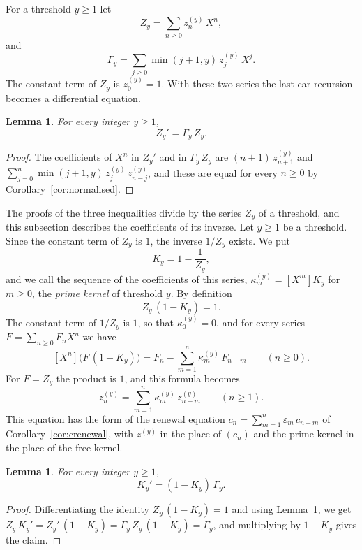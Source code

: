 \documentclass{amsart}
\makeatletter
\newtheorem{lemma}[theorem]{Lemma}
\theoremstyle{definition}
\theoremstyle{remark}
\numberwithin{equation}{section}
\def\subsection{\@startsection{subsection}{2}\z@{.5\linespacing\@plus.7\linespacing}{-.5em}{\normalfont\bfseries\boldmath}}
\makeatother
\begin{document}
For a threshold $y\ge 1$ let
\[
Z_y=\sum_{n\ge 0}z^{(y)}_n\,X^n ,
\]
and
\[
\Gamma_y=\sum_{j\ge 0}\min(j+1,y)\,z^{(y)}_j\,X^j .
\]
The constant term of $Z_y$ is $z^{(y)}_0=1$. With these two series the last-car recursion becomes a differential equation.

\begin{lemma}\label{lem:seriesode}
For every integer $y\ge 1$,
\[
Z_y'=\Gamma_y\,Z_y .
\]
\end{lemma}

\begin{proof}
The coefficients of $X^n$ in $Z_y'$ and in $\Gamma_y\,Z_y$ are $(n+1)\,z^{(y)}_{n+1}$ and $\sum_{j=0}^{n}\min(j+1,y)\,z^{(y)}_j\,z^{(y)}_{n-j}$, and these are equal for every $n\ge 0$ by Corollary~\ref{cor:normalised}.
\end{proof}

\subsection{The prime kernel}\label{subsec:series-kernel}

The proofs of the three inequalities divide by the series $Z_y$ of a threshold, and this subsection describes the coefficients of its inverse. Let $y\ge 1$ be a threshold. Since the constant term of $Z_y$ is $1$, the inverse $1/Z_y$ exists. We put
\[
K_y=1-\frac{1}{Z_y} ,
\]
and we call the sequence of the coefficients of this series, $\kappa^{(y)}_m=[X^m]K_y$ for $m\ge 0$, the \emph{prime kernel} of threshold $y$. By definition
\[
Z_y\,(1-K_y)=1 .
\]
The constant term of $1/Z_y$ is $1$, so that $\kappa^{(y)}_0=0$, and for every series $F=\sum_{n\ge 0}F_nX^n$ we have
\[
[X^n]\bigl(F\,(1-K_y)\bigr)=F_n-\sum_{m=1}^{n}\kappa^{(y)}_m\,F_{n-m}\qquad(n\ge 0).
\]
For $F=Z_y$ the product is $1$, and this formula becomes
\begin{equation}\label{eq:series-renewal}
z^{(y)}_n=\sum_{m=1}^{n}\kappa^{(y)}_m\,z^{(y)}_{n-m}\qquad(n\ge 1).
\end{equation}
This equation has the form of the renewal equation $c_n=\sum_{m=1}^{n}\varepsilon_m\,c_{n-m}$ of Corollary~\ref{cor:crenewal}, with $z^{(y)}$ in the place of $(c_n)$ and the prime kernel in the place of the free kernel.

\begin{lemma}\label{lem:kernelode}
For every integer $y\ge 1$,
\[
K_y'=(1-K_y)\,\Gamma_y .
\]
\end{lemma}

\begin{proof}
Differentiating the identity $Z_y\,(1-K_y)=1$ and using Lemma~\ref{lem:seriesode}, we get $Z_y\,K_y'=Z_y'\,(1-K_y)=\Gamma_y\,Z_y\,(1-K_y)=\Gamma_y$, and multiplying by $1-K_y$ gives the claim.
\end{proof}
\end{document}

